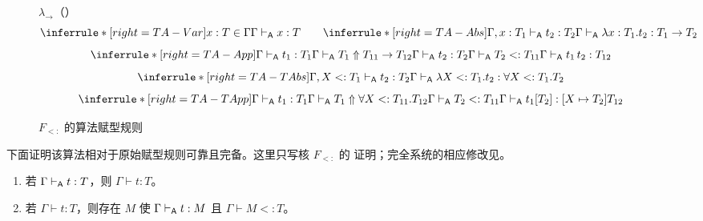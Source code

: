 \begin{figure}[!ht]
\centering
\begin{minipage}{0.96\linewidth}
  {\(\lambda_{\to}\)（）}
  {}
\[
\inferrule*[right=TA-Var]
 {x:T\in\Gamma}
 {\Gamma\algturnstile x:T}
\qquad
\inferrule*[right=TA-Abs]
 {\Gamma,x:T_1\algturnstile t_2:T_2}
 {\Gamma\algturnstile\lambda x:T_1.t_2:T_1\to T_2}
\]
\[
\inferrule*[right=TA-App]
 {\Gamma\algturnstile t_1:T_1\\
  \Gamma\algturnstile T_1\Uparrow T_{11}\to T_{12}\\
  \Gamma\algturnstile t_2:T_2\\
  \Gamma\algturnstile T_2<:T_{11}}
 {\Gamma\algturnstile t_1\,t_2:T_{12}}
\]
\[
\inferrule*[right=TA-TAbs]
 {\Gamma,X<:T_1\algturnstile t_2:T_2}
 {\Gamma\algturnstile\lambda X<:T_1.t_2:
  \forall X<:T_1.T_2}
\]
\[
\inferrule*[right=TA-TApp]
 {\Gamma\algturnstile t_1:T_1\\
  \Gamma\algturnstile T_1\Uparrow\forall X<:T_{11}.T_{12}\\
  \Gamma\algturnstile T_2<:T_{11}}
 {\Gamma\algturnstile t_1[T_2]:[X\mapsto T_2]T_{12}}
\]
\end{minipage}
\caption{\(F_{<:}\) 的算法赋型规则}
\label{fig:28-2}
\end{figure}

下面证明该算法相对于原始赋型规则可靠且完备。这里只写核 \(F_{<:}\) 的
证明；完全系统的相应修改见。

\taplstatementliststart
\begin{theorem}[最小赋型]
\label{thm:28.2.1}
\taplstatementlistbreak
\begin{enumerate}
  \item 若 \(\Gamma\mathrel{\vdash_{\mathsf A}} t:T\)，则 \(\Gamma\vdash t:T\)。
  \item 若 \(\Gamma\vdash t:T\)，则存在 \(M\) 使
        \(\Gamma\mathrel{\vdash_{\mathsf A}} t:M\) 且 \(\Gamma\vdash M<:T\)。
\end{enumerate}
\end{theorem}

